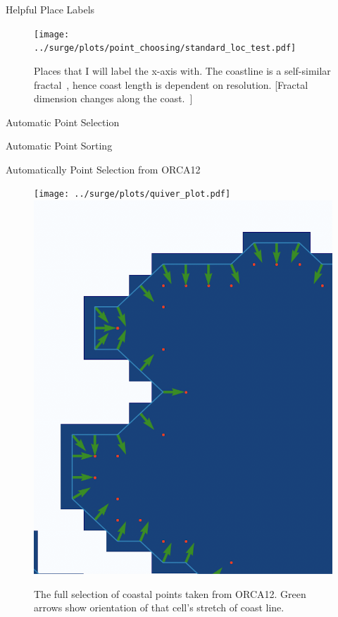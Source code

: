 \begin{frame}{Helpful Place Labels}
\vspace{-20pt}
\begin{figure}[htb!]
    \centering
    \texttt{[image: ../surge/plots/point\_choosing/standard\_loc\_test.pdf]}
    \vspace{-7pt}
    \caption{Places that I will label the x-axis with.
     The coastline is a self-similar fractal~\cite{mandelbrot1967long, richardson1961problem},
      hence coast length is dependent on resolution.
    [Fractal dimension changes along the coast.~\cite{jiang1998fractal}]}
    \label{fig:}
\end{figure}
\end{frame}


\begin{frame}[fragile]{Automatic Point Selection}
\vspace{-20pt}

\end{frame}

\begin{frame}[fragile]{Automatic Point Sorting}
\vspace{-20pt}

\end{frame}


\begin{frame}{Automatically Point Selection from ORCA12}
\vspace{-20pt}
\begin{figure}[htb!]
    \centering
    \hspace{-10pt}
    \texttt{[image: ../surge/plots/quiver\_plot.pdf]}
    \hspace{5pt}
    \includegraphics[width=0.38\linewidth]{images/example-images/new-orleans-example.png}
    \vspace{-7pt}
    \caption{The full selection of coastal points taken from ORCA12. Green arrows show
             orientation of that cell's stretch of coast line.}
\end{figure}
\end{frame}

